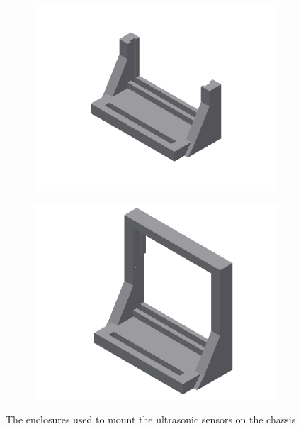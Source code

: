 \begin{figure}[H]
	\centering
	\begin{subfigure}[]{0.4\textwidth}
		\includegraphics[width=\textwidth]{images/ultrasonicholder.jpg}
	\end{subfigure}%
	\quad
	\begin{subfigure}[]{0.4\textwidth}
		\includegraphics[width=\textwidth]{images/ultrasonicholder-upsidedown.jpg}
	\end{subfigure}
	\caption{The enclosures used to mount the ultrasonic sensors on the chassis}
	\label{fig:ultrasonic-enclosures}
\end{figure}

